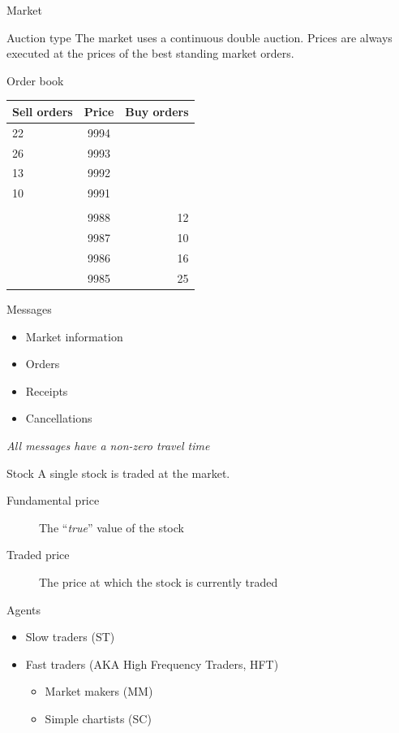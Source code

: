 \documentclass[14pt]{beamer}
\begin{document}
\begin{frame}{Market}
\begin{block}{Auction type}
The market uses a continuous double auction. Prices are always executed at the prices of the best standing market orders.
\end{block}
\end{frame}


\begin{frame}{Order book}
\begin{table}
\centering
\begin{tabular}{l|c|r}
Sell orders & Price & Buy orders\\
\midrule
22 & 9994 &\\
26 & 9993 &\\
13 & 9992 &\\
10 & 9991 &\\ 
{}&{}&{}\\
& 9988& 12\\
& 9987& 10\\
& 9986& 16\\
& 9985& 25\\
\end{tabular}
\end{table}
\end{frame}

\begin{frame}{Messages}
\begin{itemize}
\item Market information
\item Orders
\item Receipts
\item Cancellations
\end{itemize}
\textit{All messages have a non-zero travel time}
\end{frame}

\begin{frame}{Stock}
A single stock is traded at the market.
\begin{description}
\item[Fundamental price] The ``\textit{true}'' value of the stock
\item[Traded price] The price at which the stock is currently traded
\end{description}
\end{frame}


\begin{frame}{Agents}
\begin{itemize}
\item Slow traders (ST)
\item Fast traders (AKA High Frequency Traders, HFT)
\begin{itemize}
\item Market makers (MM)
\item Simple chartists (SC)
\end{itemize}
\end{itemize}
\end{frame}
\end{document}
